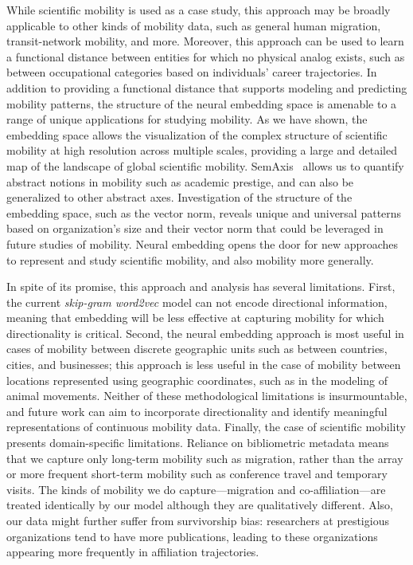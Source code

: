 \documentclass[12pt]{article} %
\begin{document}
While scientific mobility is used as a case study, this approach may be broadly applicable to other kinds of mobility data, such as general human migration, transit-network mobility, and more.
Moreover, this approach can be used to learn a functional distance between entities for which no physical analog exists, such as between occupational categories based on individuals' career trajectories.
In addition to providing a functional distance that supports modeling and predicting mobility patterns, the structure of the neural embedding space is amenable to a range of unique applications for studying mobility.
As we have shown, the embedding space allows the visualization of the complex structure of scientific mobility at high resolution across multiple scales, providing a large and detailed map of the landscape of global scientific mobility.
SemAxis~\autocite{an2018semaxis} allows us to quantify abstract notions in mobility such as academic prestige, and can also be generalized to other abstract axes.
Investigation of the structure of the embedding space, such as the vector norm, reveals unique and universal patterns based on organization's size and their vector norm that could be leveraged in future studies of mobility.
Neural embedding opens the door for new approaches to represent and study scientific mobility, and also mobility more generally.



In spite of its promise, this approach and analysis has several limitations.
First, the current \textit{skip-gram word2vec} model can not encode directional information, meaning that embedding will be less effective at capturing mobility for which directionality is critical.
Second, the neural embedding approach is most useful in cases of mobility between discrete geographic units such as between countries, cities, and businesses; this approach is less useful in the case of mobility between locations represented using geographic coordinates, such as in the modeling of animal movements.
Neither of these methodological limitations is insurmountable, and future work can aim to incorporate directionality and identify meaningful representations of continuous mobility data.
Finally, the case of scientific mobility presents domain-specific limitations.
Reliance on bibliometric metadata means that we capture only long-term mobility such as migration, rather than the array or more frequent short-term mobility such as conference travel and temporary visits.
The kinds of mobility we do capture---migration and co-affiliation---are treated identically by our model although they are qualitatively different.
Also, our data might further suffer from survivorship bias: researchers at prestigious organizations tend to have more publications, leading to these organizations appearing more frequently in affiliation trajectories.
\end{document}
